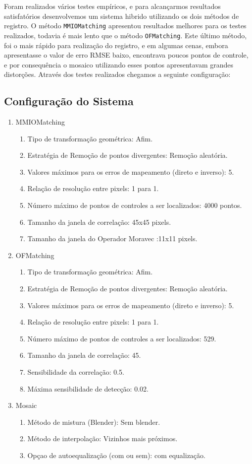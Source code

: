 \documentclass[9pt, a4paper, nofonttune, journal]{IEEEtran}
\begin{document}
Foram realizados vários testes empíricos, e para alcançarmos resultados satisfatórios desenvolvemos um sistema hibrido utilizando os dois métodos de registro. O método \texttt{MMIOMatching} apresentou resultados melhores para os testes realizados, todavia é mais lento que o método \texttt{OFMatching}. Este último método, foi o mais rápido para realização do registro, e em algumas cenas, embora apresentasse o valor de erro RMSE baixo, encontrava poucos pontos de controle, e por consequência o mosaico utilizando esses pontos apresentavam grandes distorções. Através dos testes realizados chegamos a seguinte configuração:

\subsection{Configuração do Sistema}
\begin{enumerate}
\item MMIOMatching
	\begin{enumerate}
	 \item Tipo de transformação geométrica: Afim.
	 \item Estratégia de Remoção de pontos divergentes: Remoção aleatória.
	 \item Valores máximos para os erros de mapeamento (direto e inverso): 5.
	 \item Relação de resolução entre pixels: 1 para 1.
	 \item Número máximo de pontos de controles a ser localizados: 4000 pontos.
	 \item Tamanho da janela de correlação: 45x45 pixels.
	 \item Tamanho da janela do Operador Moravec :11x11 pixels.
	\end{enumerate}
 \item OFMatching
	 \begin{enumerate}
	  \item Tipo de transformação geométrica: Afim.
	  \item Estratégia de Remoção de pontos divergentes: Remoção aleatória.
	  \item Valores máximos para os erros de mapeamento (direto e inverso): 5.
	  \item Relação de resolução entre pixels: 1 para 1.
	  \item Número máximo de pontos de controles a ser localizados: 529.
	  \item Tamanho da janela de correlação: 45.
	  \item Sensibilidade da correlação: 0.5.
	  \item Máxima sensibilidade de detecção: 0.02.
	 \end{enumerate}
 \item Mosaic
	 \begin{enumerate}
	  \item Método de mistura (Blender): Sem blender.
	  \item Método de interpolação: Vizinhos mais próximos.
	  \item Opçao de autoequalização (com ou sem): com equalização.
	 \end{enumerate}
\end{enumerate}
\end{document}
